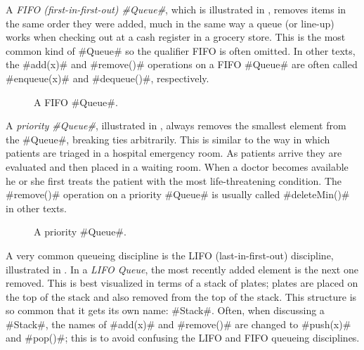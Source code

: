 A \emph{FIFO (first-in-first-out) #Queue#},   which is illustrated in , removes items in the same order they were added, much in the same way a queue (or line-up) works when checking out at a cash register in a grocery store.  This is the most common kind of #Queue# so the qualifier FIFO is often omitted.  In other texts, the #add(x)# and #remove()# operations on a FIFO #Queue# are often called #enqueue(x)# and #dequeue()#, respectively.

\begin{figure}
  \caption[A FIFO queue]{A FIFO #Queue#.}
\end{figure}

A \emph{priority #Queue#},    illustrated in , always removes the smallest element from the #Queue#, breaking ties arbitrarily.  This is similar to the way in which patients are triaged in a hospital emergency room.  As patients arrive they are evaluated and then placed in a waiting room.  When a doctor becomes available he or she first treats the patient with the most life-threatening condition.  The #remove()# operation on a priority #Queue# is usually called #deleteMin()# in other texts.

\begin{figure}
  \caption[A priority queue]{A priority #Queue#.}
\end{figure}


A very common queueing discipline is the LIFO (last-in-first-out)     discipline, illustrated in .  In a \emph{LIFO Queue}, the most recently added element is the next one removed.  This is best visualized in terms of a stack of plates; plates are placed on the top of the stack and also removed from the top of the stack. This structure is so common that it gets its own name: #Stack#.  Often, when discussing a #Stack#, the names of #add(x)# and #remove()# are changed to #push(x)# and #pop()#; this is to avoid confusing the LIFO and FIFO queueing disciplines.

